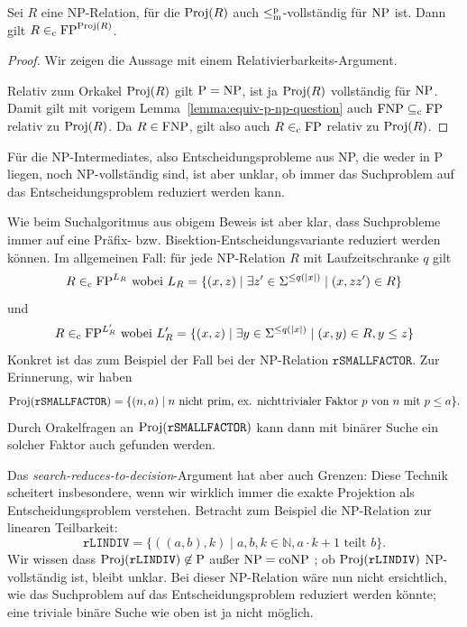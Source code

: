 \begin{corollary}\label{cor:search-to-decision}
    Sei $R$ eine NP-Relation, für die $\operatorname{Proj}(R)$ auch $\leq_\mathrm{m}^\mathrm{p}$-vollständig für $\mathrm{NP}$ ist.
    Dann gilt $R\in_\mathrm{c} \mathrm{FP}^{\operatorname{Proj}(R)}$.
\end{corollary}
\begin{proof}
    Wir zeigen die Aussage mit einem Relativierbarkeits-Argument.

    Relativ zum Orkakel $\operatorname{Proj}(R)$ gilt $\mathrm{P}=\mathrm{NP}$, ist ja $\operatorname{Proj}(R)$ vollständig für $\mathrm{NP}$. Damit gilt mit vorigem Lemma~\ref{lemma:equiv-p-np-question} auch $\mathrm{FNP} \subseteq_\mathrm{c} \mathrm{FP}$ relativ zu $\operatorname{Proj}(R)$.
    Da $R\in \mathrm{FNP}$, gilt also auch $R\in_\mathrm{c} \mathrm{FP}$ relativ zu $\operatorname{Proj}(R)$.
\end{proof}

Für die NP-Intermediates, also Entscheidungsprobleme aus NP, die weder in P liegen, noch NP-vollständig sind, ist aber unklar, ob immer das Suchproblem auf das Entscheidungsproblem reduziert werden kann.

Wie beim Suchalgoritmus aus obigem Beweis ist aber klar, dass Suchprobleme immer auf eine Präfix- bzw. Bisektion-Entscheidungsvariante reduziert werden können.
Im allgemeinen Fall: für jede NP-Relation $R$ mit Laufzeitschranke $q$ gilt
\[ R \in_\mathrm{c} \mathrm{FP}^{L_R} \text{ wobei } L_R = \{ (x, z) \mid \exists z'\in\Sigma^{\leq q(|x|)} \mid (x, zz')\in R \} \]
und 
\[ R \in_\mathrm{c} \mathrm{FP}^{L'_R} \text{ wobei } L'_R = \{ (x, z) \mid \exists y\in\Sigma^{\leq q(|x|)} \mid (x, y) \in R, y\leq z \} \]
Konkret ist das zum Beispiel der Fall bei der NP-Relation $\mathtt{rSMALLFACTOR}$. Zur Erinnerung, wir haben
\[ \operatorname{Proj}(\mathtt{rSMALLFACTOR}) = \{ (n,a)\mid \text{$n$ nicht prim, ex. nichttrivialer Faktor $p$ von $n$ mit $p\leq a$} \}. \]
Durch Orakelfragen an $\operatorname{Proj}(\mathtt{rSMALLFACTOR})$ kann dann mit binärer Suche ein solcher Faktor auch gefunden werden.

Das \emph{search-reduces-to-decision}-Argument hat aber auch Grenzen:
Diese Technik scheitert insbesondere, wenn wir wirklich immer die exakte Projektion als Entscheidungsproblem verstehen. Betracht zum Beispiel die NP-Relation zur linearen Teilbarkeit:
\[ \mathtt{rLINDIV} = \{ ((a, b), k) \mid a,b,k\in\mathbb N, a\cdot k + 1\text{ teilt } b\}. \]
Wir wissen dass $\operatorname{Proj}(\mathtt{rLINDIV})\not\in \mathrm{P}$ außer $\mathrm{NP}=\mathrm{coNP}$ \parencite{adleman_reducibility_1977}; ob $\operatorname{Proj}(\mathtt{rLINDIV})$ NP-vollständig ist, bleibt unklar.
Bei dieser NP-Relation wäre nun nicht ersichtlich, wie das Suchproblem auf das Entscheidungsproblem reduziert werden könnte; eine triviale binäre Suche wie oben ist ja nicht möglich.


